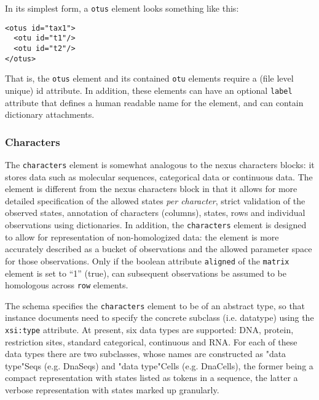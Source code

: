\documentclass{article}
\newcommand{\code}{\texttt}
\begin{document}
In its simplest form, a \code{otus} element looks something like this:
\begin{verbatim}
<otus id="tax1">
  <otu id="t1"/>
  <otu id="t2"/>
</otus>
\end{verbatim}
That is, the \code{otus} element and its contained \code{otu} elements require a (file level unique) id attribute. In 
addition, these elements can have an optional \code{label} attribute that defines a human readable name for the element, and 
can contain dictionary attachments.

\subsubsection{Characters}

The \code{characters} element is somewhat analogous to the nexus characters blocks: it stores data such as molecular sequences, 
categorical data or continuous data. The element is different from the nexus characters block in that it allows for more detailed 
specification of the allowed states \textit{per character}, strict validation of the observed states, annotation of characters (columns), 
states, rows and individual observations using dictionaries. In addition, the \code{characters} element is 
designed to allow for representation of non-homologized data: the element is more accurately described as a bucket of observations and 
the allowed parameter space for those observations. Only if the boolean attribute \code{aligned} of the \code{matrix} 
element is set to ``1'' (true), can subsequent observations be assumed to be homologous across \code{row} elements.

The schema specifies the \code{characters} element to be of an abstract type, so that instance documents need to specify the 
concrete subclass (i.e. datatype) using the \code{xsi:type} attribute. At present, six data types are supported: DNA, protein, 
restriction sites, standard categorical, continuous and RNA. For each of these data types there are two subclasses, whose names are 
constructed as "data type"Seqs (e.g. DnaSeqs) and "data type"Cells (e.g. DnaCells), the former being a compact representation with 
states listed as tokens in a sequence, the latter a verbose representation with states marked up granularly.
\end{document}
